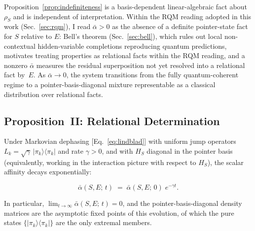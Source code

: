 \begin{remark}
Proposition~\ref{prop:indefiniteness} is a basis-dependent
linear-algebraic fact about $\rho_S$ and is independent of
interpretation.
Within the RQM reading adopted in this work (Sec.~\ref{sec:rqm}), I
read $\bar\alpha > 0$ as the absence of a definite pointer-state fact
for $S$ relative to $E$: Bell's theorem
(Sec.~\ref{sec:bell}), which rules out local non-contextual hidden-variable completions reproducing quantum predictions, motivates
treating properties as relational facts within the RQM reading, and a
nonzero $\bar\alpha$ measures the residual superposition not yet
resolved into a relational fact by~$E$.
As $\bar\alpha \to 0$, the system transitions from the fully
quantum-coherent regime to a pointer-basis-diagonal mixture
representable as a classical distribution over relational facts.
\end{remark}


\subsection{\label{sec:prop2}Proposition~II: Relational Determination}

\begin{proposition}
\label{prop:determination}
Under Markovian dephasing [Eq.~\eqref{eq:lindblad}] with uniform
jump operators $L_k = \sqrt{\gamma}\,\vert\pi_k\rangle\langle\pi_k\vert$
and rate $\gamma > 0$, and with $H_S$ diagonal in the pointer basis
(equivalently, working in the interaction picture with respect to $H_S$),
the scalar affinity decays exponentially:

\begin{equation}
\label{eq:alpha-decay}
\bar{\alpha}(S,E;\,t)
  \;=\;
  \bar{\alpha}(S,E;\,0)\;e^{-\gamma t}.
\end{equation}

\noindent
In particular, $\lim_{t\to\infty}\bar{\alpha}(S,E;\,t) = 0$, and the
pointer-basis-diagonal density matrices are the asymptotic fixed points
of this evolution, of which the pure states
$\{\vert\pi_k\rangle\langle\pi_k\vert\}$ are the only extremal members.
\end{proposition}

